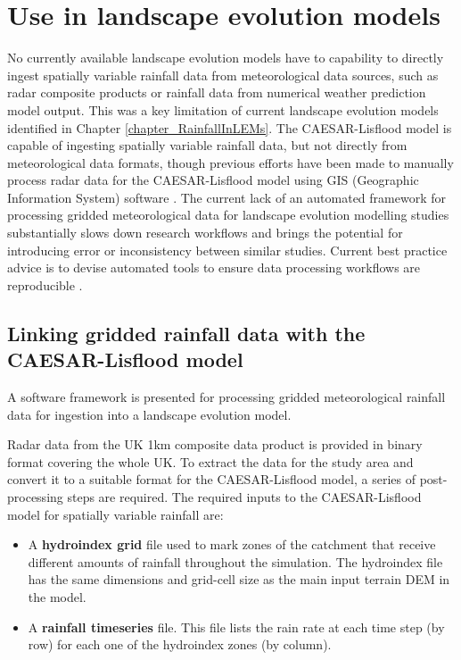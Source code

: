 \section{Use in landscape evolution models}
No currently available landscape evolution models have to capability to directly ingest spatially variable rainfall data from meteorological data sources, such as radar composite products or rainfall data from numerical weather prediction model output. This was a key limitation of current landscape evolution models identified in Chapter \ref{chapter_RainfallInLEMs}. The CAESAR-Lisflood model is capable of ingesting spatially variable rainfall data, but not directly from meteorological data formats, though previous efforts have been made to manually process radar data for the CAESAR-Lisflood model using GIS (Geographic Information System) software \citep[e.g.][]{coulthard2016sensitivity}. The current lack of an automated framework for processing gridded meteorological data for landscape evolution modelling studies substantially slows down research workflows and brings the potential for introducing error or inconsistency between similar studies. Current best practice advice is to devise automated tools to ensure data processing workflows are reproducible \citep{wilson2014best}.

\subsection{Linking gridded rainfall data with the CAESAR-Lisflood model}
A software framework is presented for processing gridded meteorological rainfall data for ingestion into a landscape evolution model.

Radar data from the UK 1km composite data product is provided in binary format covering the whole UK. To extract the data for the study area and convert it to a suitable format for the CAESAR-Lisflood model, a series of post-processing steps are required. The required inputs to the CAESAR-Lisflood model for spatially variable rainfall are:

\begin{itemize}
\item A \textbf{hydroindex grid} file used to mark zones of the catchment that receive different amounts of rainfall throughout the simulation. The hydroindex file has the same dimensions and grid-cell size as the main input terrain DEM in the model.
\item A \textbf{rainfall timeseries} file. This file lists the rain rate at each time step (by row) for each one of the hydroindex zones (by column).
\end{itemize}

